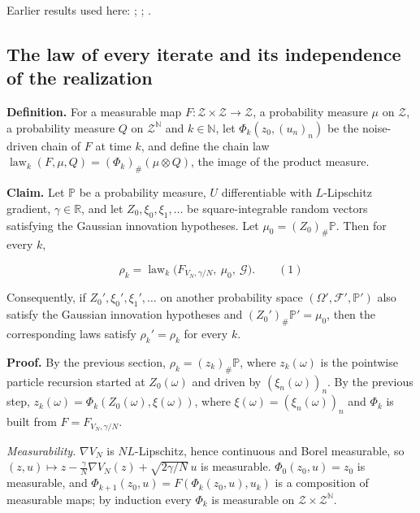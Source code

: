 \documentclass[11pt,a4paper]{report}
\begin{document}
Earlier results used here: \cite[Section~3.20.1]{LangevinLean2026ULASC}; \cite[Section~3.20.3]{LangevinLean2026ULASC}; \cite[Section~3.23.1]{LangevinLean2026ULASC}.
\subsection{\texorpdfstring{The law of every iterate and its independence of the realization}{The law of every iterate and its independence of the realization}}
\label{report-step-IPLA-AlgorithmLaw-lean-4}


\textbf{Definition.} For a measurable map \(F:\mathcal Z\times\mathcal Z\to\mathcal Z\), a probability measure \(\mu\) on \(\mathcal Z\), a probability measure \(Q\) on \(\mathcal Z^{\mathbb N}\) and \(k\in\mathbb N\), let \(\Phi_k(z_0,(u_n)_n)\) be the noise-driven chain of \(F\) at time \(k\), and define the chain law \(\operatorname{law}_k(F,\mu,Q)=(\Phi_k)_\#(\mu\otimes Q)\), the image of the product measure.




\textbf{Claim.} Let \(\mathbb P\) be a probability measure, \(U\) differentiable with \(L\)-Lipschitz gradient, \(\gamma\in\mathbb R\), and let \(Z_0,\xi_0,\xi_1,\dots\) be square-integrable random vectors satisfying the Gaussian innovation hypotheses. Let \(\mu_0=(Z_0)_\#\mathbb P\). Then for every \(k\),


\[\rho_k=\operatorname{law}_k\bigl(F_{V_N,\gamma/N},\ \mu_0,\ \mathcal G\bigr).\qquad(1)\]


Consequently, if \(Z_0',\xi_0',\xi_1',\dots\) on another probability space \((\Omega',\mathcal F',\mathbb P')\) also satisfy the Gaussian innovation hypotheses and \((Z_0')_\#\mathbb P'=\mu_0\), then the corresponding laws satisfy \(\rho_k'=\rho_k\) for every \(k\).




\textbf{Proof.} By the previous section, \(\rho_k=(z_k)_\#\mathbb P\), where \(z_k(\omega)\) is the pointwise particle recursion started at \(Z_0(\omega)\) and driven by \((\xi_n(\omega))_n\). By the previous step, \(z_k(\omega)=\Phi_k(Z_0(\omega),\xi(\omega))\), where \(\xi(\omega)=(\xi_n(\omega))_n\) and \(\Phi_k\) is built from \(F=F_{V_N,\gamma/N}\).




\emph{Measurability.} \(\nabla V_N\) is \(NL\)-Lipschitz, hence continuous and Borel measurable, so \((z,u)\mapsto z-\frac\gamma N\nabla V_N(z)+\sqrt{2\gamma/N}\,u\) is measurable. \(\Phi_0(z_0,u)=z_0\) is measurable, and \(\Phi_{k+1}(z_0,u)=F(\Phi_k(z_0,u),u_k)\) is a composition of measurable maps; by induction every \(\Phi_k\) is measurable on \(\mathcal Z\times\mathcal Z^{\mathbb N}\).
\end{document}
